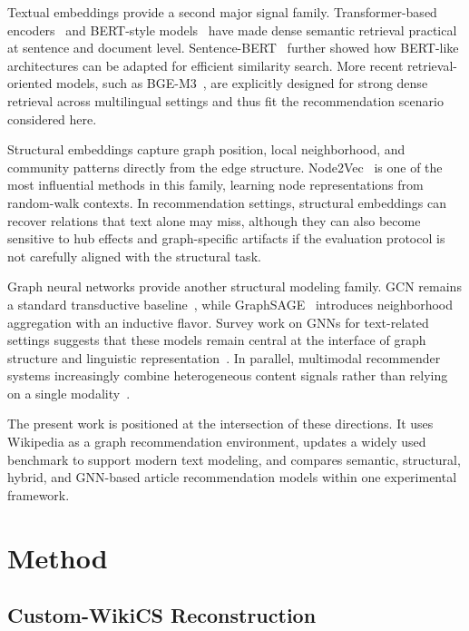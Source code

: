 \documentclass[runningheads]{llncs}
\begin{document}
Textual embeddings provide a second major signal family. Transformer-based
encoders~\cite{vaswani2017attention} and BERT-style models~\cite{devlin2019bert}
have made dense semantic retrieval practical at sentence and document level.
Sentence-BERT~\cite{reimers2019sentencebert} further showed how BERT-like
architectures can be adapted for efficient similarity search. More recent
retrieval-oriented models, such as BGE-M3~\cite{chen2024m3embedding}, are explicitly
designed for strong dense retrieval across multilingual settings and thus fit
the recommendation scenario considered here.

Structural embeddings capture graph position, local neighborhood, and community
patterns directly from the edge structure. Node2Vec~\cite{grover2016node2vec}
is one of the most influential methods in this family, learning node
representations from random-walk contexts. In recommendation settings,
structural embeddings can recover relations that text alone may miss, although
they can also become sensitive to hub effects and graph-specific artifacts if
the evaluation protocol is not carefully aligned with the structural task.

Graph neural networks provide another structural modeling family. GCN remains a
standard transductive baseline~\cite{kipf2017semi}, while
GraphSAGE~\cite{hamilton2017inductive} introduces neighborhood aggregation with
an inductive flavor. Survey work on GNNs for text-related settings suggests
that these models remain central at the interface of graph structure and
linguistic representation~\cite{wang2024gnntextsurvey}. In parallel, multimodal
recommender systems increasingly combine heterogeneous content signals rather
than relying on a single modality~\cite{liu2024multimodal}.

The present work is positioned at the intersection of these directions. It uses
Wikipedia as a graph recommendation environment, updates a widely used benchmark
to support modern text modeling, and compares semantic, structural, hybrid, and
GNN-based article recommendation models within one experimental framework.


\section{Method}
\subsection{Custom-WikiCS Reconstruction}
\end{document}
